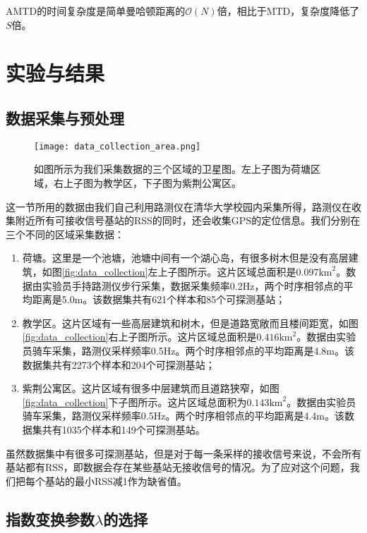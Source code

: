 AMTD的时间复杂度是简单曼哈顿距离的$\mathcal{O}(N)$倍，相比于MTD，复杂度降低了$S$倍。

\section{实验与结果} \label{sec:exp}

\subsection{数据采集与预处理}

\begin{figure}[tb]
	\centering
	\texttt{[image: data\_collection\_area.png]}
	\caption{如图所示为我们采集数据的三个区域的卫星图。左上子图为荷塘区域，右上子图为教学区，下子图为紫荆公寓区。}
	\label{fig:data_collection}
\end{figure}

这一节所用的数据由我们自己利用路测仪在清华大学校园内采集所得，路测仪在收集附近所有可接收信号基站的RSS的同时，还会收集GPS的定位信息。我们分别在三个不同的区域采集数据：
\begin{enumerate}
	\item 荷塘。这里是一个池塘，池塘中间有一个湖心岛，有很多树木但是没有高层建筑，如图\eqref{fig:data_collection}左上子图所示。这片区域总面积是$0.097\mathrm{km}^2$。数据由实验员手持路测仪步行采集，数据采集频率0.2Hz，两个时序相邻点的平均距离是5.0m。该数据集共有621个样本和85个可探测基站；
	\item 教学区。这片区域有一些高层建筑和树木，但是道路宽敞而且楼间距宽，如图\eqref{fig:data_collection}右上子图所示。这片区域总面积是$0.416\mathrm{km}^2$。数据由实验员骑车采集，路测仪采样频率0.5Hz。两个时序相邻点的平均距离是4.8m。该数据集共有2273个样本和204个可探测基站；
	\item 紫荆公寓区。这片区域有很多中层建筑而且道路狭窄，如图\eqref{fig:data_collection}下子图所示。这片区域总面积为$0.143\mathrm{km}^2$。数据由实验员骑车采集，路测仪采样频率0.5Hz。两个时序相邻点的平均距离是4.4m。该数据集共有1035个样本和149个可探测基站。
\end{enumerate}

虽然数据集中有很多可探测基站，但是对于每一条采样的接收信号来说，不会所有基站都有RSS，即数据会存在某些基站无接收信号的情况。为了应对这个问题，我们把每个基站的最小RSS减1作为缺省值。

\subsection{指数变换参数$\lambda$的选择} \label{subsec:lambda}

